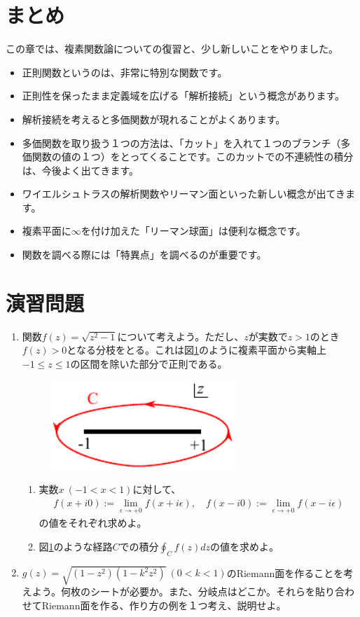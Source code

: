\documentclass[report,paper=a4, fontsize=12pt, line_length=16cm, number_of_lines=33,dvipdfmx]{jlreq}
\numberwithin{equation}{section}
\begin{document}
\section{まとめ}
この章では、複素関数論についての復習と、少し新しいことをやりました。
\begin{itemize}
  \item 正則関数というのは、非常に特別な関数です。
  \item 正則性を保ったまま定義域を広げる「解析接続」という概念があります。
  \item 解析接続を考えると多価関数が現れることがよくあります。
  \item 多価関数を取り扱う１つの方法は、「カット」を入れて１つのブランチ（多価関数の値の１つ）をとってくることです。このカットでの不連続性の積分は、今後よく出てきます。
  \item ワイエルシュトラスの解析関数やリーマン面といった新しい概念が出てきます。
  \item 複素平面に$\infty$を付け加えた「リーマン球面」は便利な概念です。
  \item 関数を調べる際には「特異点」を調べるのが重要です。
\end{itemize}
\section{演習問題}\label{ex:complexanalysis}
\begin{enumerate}
  \setlength{\itemsep}{1cm}
    \item 関数$f(z)=\sqrt{z^2-1}$について考えよう。ただし、$z$が実数で$z>1$のとき$f(z)>0$となる分枝をとる。これは図\ref{fig:domain}のように複素平面から実軸上$-1\le z \le 1$の区間を除いた部分で正則である。
    \begin{figure}[htbp]
      \centering
      \includegraphics[width=7cm]{cut2.pdf}
      \caption{}
      \label{fig:domain}
    \end{figure}
      \begin{enumerate}
      \item 実数$x\ (-1<x<1)$に対して、
      \begin{align*}
        f(x+i0):=\lim_{\epsilon \to +0}f(x+i \epsilon),\quad f(x-i0):=\lim_{\epsilon \to +0}f(x-i \epsilon)
      \end{align*} 
      の値をそれぞれ求めよ。
      \item 図\ref{fig:domain}のような経路$C$での積分$\oint_{C}f(z)dz$の値を求めよ。
    \end{enumerate}
    \item $g(z)=\sqrt{(1-z^2)(1-k^2z^2)}\ (0<k<1)$のRiemann面を作ることを考えよう。何枚のシートが必要か。また、分岐点はどこか。それらを貼り合わせてRiemann面を作る、作り方の例を１つ考え、説明せよ。
\end{enumerate}
  
\end{document}
